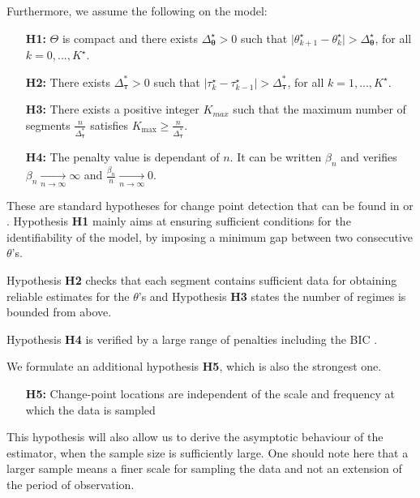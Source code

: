
Furthermore, we assume the following on the model:  
\begin{itemize}
\item[\textbf{H1:}] $\Theta$ is compact and there exists $\Delta_{\bm \theta}^{\star}>0$ such that $\vert \theta_{k+1}^{\star}-\theta_{k}^{\star}\vert > \Delta_{\bm \theta}^{\star}$, for all $k=0,...,K^{\star}$.
\item[\textbf{H2:}] There exists $\Delta_{\bm \tau}^*>0$ such that $\vert \tau_{k}^{\star}-\tau_{k-1}^{\star}\vert > \Delta^*_{\bm \tau}$, for all $k=1,...,K^{\star}$.
\item[\textbf{H3:}]  There exists a positive integer $K_{max}$ such that the maximum number of segments $\frac{n}{\Delta^*_{\bm \tau}}$ satisfies $K_{\max} \geq \frac{n}{\Delta^*_{\bm \tau}}$. 
\item[\textbf{H4:}] The penalty value is dependant of $n$. It can be written $\beta_{n}$ and verifies $\beta_{n}\xrightarrow[n\rightarrow \infty]{} \infty$ and $\frac{\beta_{n}}{n}\xrightarrow[n\rightarrow \infty]{} 0$.
\end{itemize}

These are standard hypotheses for change point detection that can be found in \cite{Lavielle1997} or \cite{He2010}. Hypothesis \textbf{H1} mainly aims at ensuring sufficient conditions for the identifiability of the model, by imposing a minimum gap between two consecutive $\theta$'s. 

Hypothesis \textbf{H2} checks that each segment contains sufficient data for obtaining reliable estimates for the $\theta$'s and Hypothesis \textbf{H3} states the number of regimes is bounded from above.  

Hypothesis \textbf{H4} is verified by a large range of penalties including the BIC \citep{YAO1988181}. 

We formulate an additional hypothesis \textbf{H5}, which is also the strongest one. 
\begin{itemize}
\item[\textbf{H5:}] Change-point locations are independent of the scale and frequency at which the data is sampled
\end{itemize}
This hypothesis will also allow us to derive the asymptotic behaviour of the estimator, when the sample size is sufficiently large. One should note here that a larger sample means a finer scale for sampling the data and not an extension of the period of observation. 

